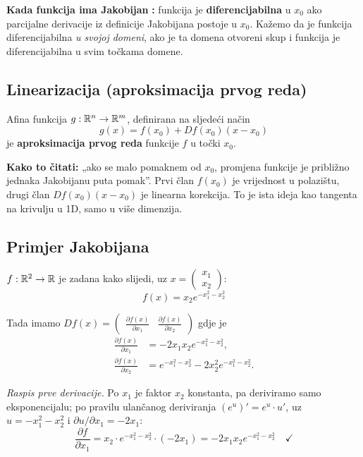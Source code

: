 \textbf{Kada funkcija ima Jakobijan} \textbf{:} funkcija je
\textbf{diferencijabilna} u $x_0$ ako parcijalne derivacije iz definicije
Jakobijana postoje u $x_0$. Kažemo da je funkcija diferencijabilna
\emph{u svojoj domeni}, ako je ta domena otvoreni skup i funkcija je
diferencijabilna u svim točkama domene.

\subsection{Linearizacija (aproksimacija prvog reda)}

\begin{teorem}
Afina funkcija $g : \mathbb{R}^n \to \mathbb{R}^m$, definirana na sljedeći način
\[
g(x) = f(x_0) + Df(x_0)(x - x_0)
\]
je \textbf{aproksimacija prvog reda} funkcije $f$ u točki $x_0$.
\end{teorem}

\textbf{Kako to čitati:} „ako se malo pomaknem od $x_0$, promjena funkcije je
približno jednaka Jakobijanu puta pomak”. Prvi član $f(x_0)$ je vrijednost u
polazištu, drugi član $Df(x_0)(x-x_0)$ je linearna korekcija. To je ista ideja
kao tangenta na krivulju u 1D, samo u više dimenzija.

\subsection{Primjer Jakobijana}

$f : \mathbb{R}^2 \to \mathbb{R}$ je zadana kako slijedi, uz
$x = \begin{pmatrix} x_1 \\ x_2 \end{pmatrix}$:
\[
f(x) = x_2 e^{-x_1^2 - x_2^2}
\]

Tada imamo $Df(x) = \begin{pmatrix}
\frac{\partial f(x)}{\partial x_1} & \frac{\partial f(x)}{\partial x_2}
\end{pmatrix}$ gdje je
\begin{align}
\frac{\partial f(x)}{\partial x_1} &= -2x_1x_2e^{-x_1^2-x_2^2}, \\
\frac{\partial f(x)}{\partial x_2} &= e^{-x_1^2-x_2^2}
                                     - 2x_2^2 e^{-x_1^2-x_2^2}.
\end{align}

\emph{Raspis prve derivacije.} Po $x_1$ je faktor $x_2$ konstanta, pa
deriviramo samo eksponencijalu; po pravilu ulančanog deriviranja
$\left(e^{u}\right)' = e^{u}\cdot u'$, uz $u = -x_1^2-x_2^2$ i
$\partial u/\partial x_1 = -2x_1$:
\[
\frac{\partial f}{\partial x_1}
= x_2 \cdot e^{-x_1^2-x_2^2}\cdot(-2x_1) = -2x_1x_2e^{-x_1^2-x_2^2}
\quad\checkmark
\]

